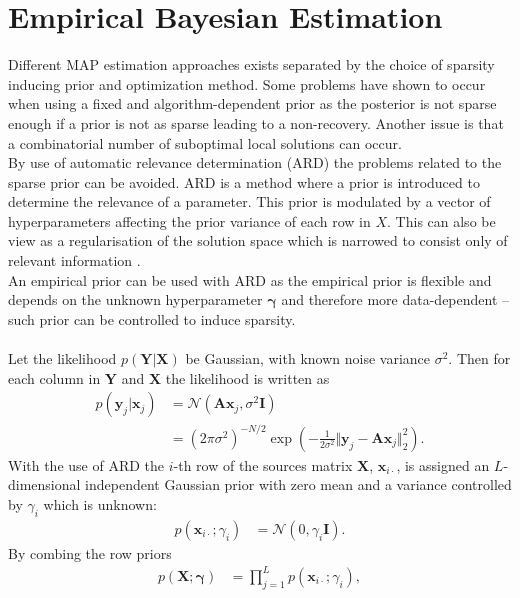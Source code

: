 \section{Empirical Bayesian Estimation}
Different MAP estimation approaches exists separated by the choice of sparsity inducing prior and optimization method. Some problems have shown to occur when using a fixed and algorithm-dependent prior as the posterior is not sparse enough if a prior is not as sparse leading to a non-recovery. 
Another issue is that a combinatorial number of suboptimal local solutions can occur.  
\\
By use of automatic relevance determination (ARD) the problems related to the sparse prior can be avoided. ARD is a method where a prior is introduced to determine the relevance of a parameter. This prior is modulated by a vector of hyperparameters affecting the prior variance of each row in $X$.
This can also be view as a regularisation of the solution space which is narrowed to consist only of relevant information \cite{ARD}.
\\
An empirical prior can be used with ARD as the empirical prior is flexible and depends on the unknown hyperparameter $\boldsymbol{\gamma}$ and therefore more data-dependent -- such prior can be controlled to induce sparsity.
\\ \\
Let the likelihood $p(\mathbf{Y} \vert \mathbf{X})$ be Gaussian, with known noise variance $\sigma^2$. Then for each column in $\mathbf{Y}$ and $\mathbf{X}$ the likelihood is written as
\begin{align*}
p(\mathbf{y}_{j} \vert \mathbf{x}_{j}) &= \mathcal{N}(\mathbf{Ax}_{j}, \sigma^2 \mathbf{I}) \\
&= (2 \pi \sigma^2)^{-N/2} \exp \left( - \frac{1}{2 \sigma^2} \Vert \mathbf{y}_{j} - \mathbf{A} \mathbf{x}_{j} \Vert_2^2 \right).
\end{align*}
With the use of ARD the $i$-th row of the sources matrix $\mathbf{X}$, $\mathbf{x}_{i \cdot}$, is assigned an $L$-dimensional independent Gaussian prior with zero mean and a variance controlled by $\gamma_i$ which is unknown:
\begin{align*}
p (\mathbf{x}_{i \cdot} ; \gamma_i) &= \mathcal{N}(0, \gamma_i \mathbf{I}).
\end{align*}
By combing the row priors
\begin{align*}
p (\mathbf{X} ; \boldsymbol{\gamma}) &= \prod_{j=1}^L p (\mathbf{x}_{i \cdot} ; \gamma_i),
\end{align*}
